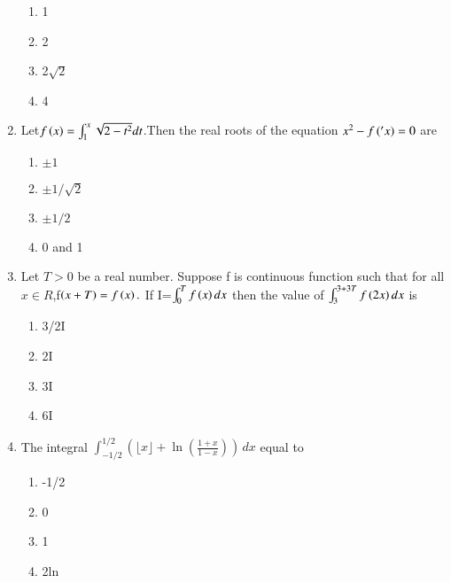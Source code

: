 \documentclass[journal,12pt,twocolumn]{IEEEtran}
\theoremstyle{remark}
\begin{document}
\begin{enumerate}
\begin{enumerate}
 \item  1
 \item  2
 \item  2$\sqrt{2}$
 \item  4
 \hfill{}
\end{enumerate}
\item Let$f\left(x\right)=\int_{1}^{x}\sqrt{2-{t}^2} dt $.Then the real roots of the equation ${x}^2-f\left('x\right)=0$ are 
\begin{enumerate}
  \item $\pm{1}$
  \item $\pm{1/\sqrt2}$
  \item $\pm{1/2}$
   \item 0 and 1
   \hfill{}
   \end{enumerate}
   \item Let $T>0$ be a real number. Suppose f is continuous function such that for all ${x}\in{R}$,f$\left(x+T\right)=f\left(x\right).$
   If I=$\int_{0}^{T}f\left(x\right)dx$ then the value of $\int_{3}^{3+3T} f\left(2x\right) dx $ is
\begin{enumerate}
   \item 3/2{I} 
   \item 2I
   \item 3I
   \item 6I
   \hfill{}
   \end{enumerate}
   \item The integral $\int_{-1/2}^{1/2} \left( \lfloor x \rfloor + \ln \left( \frac{1+x}{1-x} \right) \right) \, dx$ equal to
\begin{enumerate}[label=(\alph*)]
 \item -1/2
 \item 0
 \item 1
 \item 2ln
 \end{enumerate}




\end{enumerate}
\end{document}
